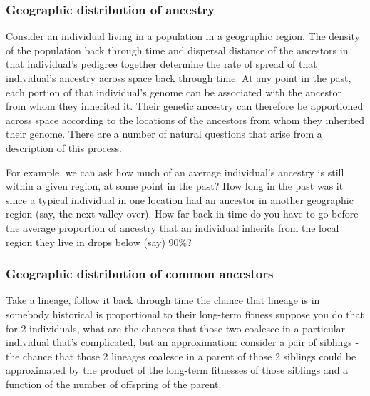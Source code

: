 \documentclass{ar-1col}
\newcommand{\todo}[1]{{\textbf{\color{red}{#1}}}}
\begin{document}
\subsubsection{Geographic distribution of ancestry}

Consider an individual living in a population in a geographic region.
The density of the population back through time and 
dispersal distance of the ancestors in that individual's pedigree 
together determine the rate of spread of that individual's ancestry 
across space back through time.
At any point in the past,
each portion of that individual's genome can be associated 
with the ancestor from whom they inherited it.
Their genetic ancestry can therefore be apportioned across space according
to the locations of the ancestors from whom they inherited their genome.
There are a number of natural questions that arise from a description of this process.

For example, we can ask how much of an average individual's ancestry is still within a given region, at some point in the past?
How long in the past was it since a typical individual in one location had an ancestor
in another geographic region (say, the next valley over).
How far back in time do you have to go before the average proportion of ancestry that an individual inherits
from the local region they live in drops below (say) 90\%?

\todo{tidy and conclude}

\begin{figure}[ht]
    \centering
        \caption{
		\todo{individuals shaded according to the proportion of ancestry 
		of a given small cluster of samples they contribute, 
		at several points back in time - shows spread of ancestry across space through time}
        }
        \label{ancestry_spread}
\end{figure}

\subsubsection{Geographic distribution of common ancestors}

Take a lineage, follow it back through time
the chance that lineage is in somebody historical is proportional to their long-term fitness
suppose you do that for 2 individuals,
what are the chances that those two coalesce in a particular individual
that's complicated,
but an approximation:
consider a pair of siblings - the chance that those 2 lineages coalesce in a parent of those 2 siblings could be approximated by the product of the long-term fitnesses of those siblings
and a function of the number of offspring of the parent.
\end{document}

